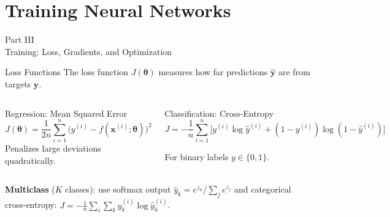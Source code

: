 \documentclass[aspectratio=169,11pt]{beamer}
\newcommand{\x}{\bm{x}}
\begin{document}

\section{Training Neural Networks}

\begin{frame}{}
\begin{center}
{\Huge \textcolor{uzhblue}{Part III}}\\[0.8em]
{\LARGE Training: Loss, Gradients, and Optimization}
\end{center}
\end{frame}

\begin{frame}{Loss Functions}
The loss function $J(\bm{\theta})$ measures how far predictions $\hat{\bm{y}}$ are from targets $\bm{y}$.

\vspace{0.4cm}
\begin{columns}[T]
\begin{block}{Regression: Mean Squared Error}
\[
    J(\bm{\theta}) = \frac{1}{2n}\sum_{i=1}^{n}\big(y^{(i)} - f(\x^{(i)};\bm{\theta})\big)^{2}
\]
Penalizes large deviations quadratically.
\end{block}

\begin{block}{Classification: Cross-Entropy}
{\footnotesize
\[
    J = -\frac{1}{n}\sum_{i=1}^{n}\!\Big[y^{(i)}\!\log\hat{y}^{(i)} + (1{-}y^{(i)})\log(1{-}\hat{y}^{(i)})\Big]
\]}%
\vspace{-0.3cm}

For binary labels $y\in\{0,1\}$.
\end{block}
\end{columns}

\vspace{0.3cm}
\textbf{Multiclass} ($K$ classes): use softmax output $\hat{y}_k = e^{z_k}\big/\sum_j e^{z_j}$ and categorical cross-entropy:
$J = -\frac{1}{n}\sum_{i}\sum_{k} y_k^{(i)}\log \hat{y}_k^{(i)}$.
\end{frame}
\end{document}
